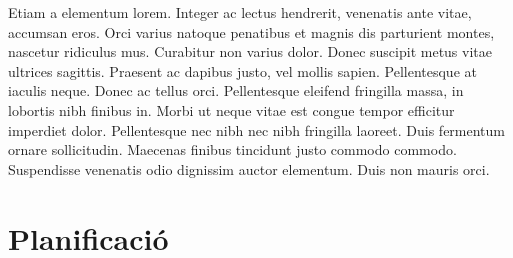 \documentclass[a4paper,12pt,twoside]{ThesisStyle}
\begin{document}
\begin{appendices}
Etiam a elementum lorem. Integer ac lectus hendrerit, venenatis ante vitae, accumsan eros. Orci varius natoque penatibus et magnis dis parturient montes, nascetur ridiculus mus. Curabitur non varius dolor. Donec suscipit metus vitae ultrices sagittis. Praesent ac dapibus justo, vel mollis sapien. Pellentesque at iaculis neque. Donec ac tellus orci. Pellentesque eleifend fringilla massa, in lobortis nibh finibus in. Morbi ut neque vitae est congue tempor efficitur imperdiet dolor. Pellentesque nec nibh nec nibh fringilla laoreet. Duis fermentum ornare sollicitudin. Maecenas finibus tincidunt justo commodo commodo. Suspendisse venenatis odio dignissim auctor elementum. Duis non mauris orci.

\chapter{Planificació}


\end{appendices}

\end{document}
